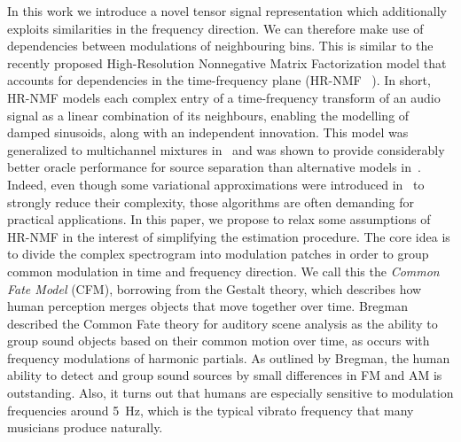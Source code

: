 In this work we introduce a novel tensor signal representation which additionally exploits similarities in the frequency direction. We can therefore make use of dependencies between modulations of neighbouring bins. This is similar to the recently proposed High-Resolution Nonnegative Matrix Factorization
model that accounts for dependencies in the time-frequency plane (HR-NMF
~\cite{badeau11}). In short, HR-NMF models each complex entry of a time-frequency transform of an audio signal as a linear combination of its neighbours, enabling the modelling of damped sinusoids, along with an independent
innovation. This model was generalized to multichannel mixtures in~\cite{badeau13a,badeau14}
and was shown to provide considerably better oracle performance for source separation than alternative models in~\cite{magron15a}.
Indeed, even though some variational approximations were introduced
in~\cite{badeau13} to strongly reduce their complexity,
those algorithms are often demanding for practical applications.
In this paper, we propose to relax some assumptions of HR-NMF in the interest of simplifying the estimation procedure. The core idea is to divide the complex spectrogram into modulation patches in order to group common modulation in time and frequency direction. We call this the \emph{Common Fate Model} (CFM), borrowing from the Gestalt theory, which describes how human perception merges objects that move together over time. Bregman~\cite{bregman94} described the Common Fate theory for auditory scene analysis as the ability to group sound objects based on their common motion over time, as occurs with frequency modulations of harmonic partials. As outlined by Bregman, the human ability to detect and group sound sources by small differences in FM and AM is outstanding. Also, it turns out that humans are especially sensitive to modulation frequencies around 5~Hz, which is the typical vibrato frequency that many musicians produce naturally.
